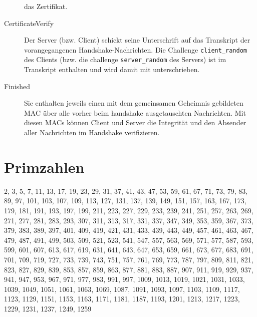 \documentclass[a4paper,landscape]{article}
\begin{document}
\begin{multicols*}{4}
\begin{description}
		      das Zertifikat.
		\item[CertificateVerify] Der Server (bzw. Client) schickt seine
		      Unterschrift auf das Transkript der vorangegangenen
		      Handshake-Nachrichten. Die Challenge \texttt{client\_random} des
		      Clients (bzw. die challenge \texttt{server\_random} des Servers)
		      ist im Transkript enthalten und wird damit mit unterschrieben.
		\item[Finished] Sie enthalten jeweils einen mit dem gemeinsamen
		      Geheimnis gebildeten MAC über alle vorher beim handshake ausgetauschten
		      Nachrichten. Mit diesen MACs können Client und Server die Integrität und
		      den Absender aller Nachrichten im Handshake verifizieren.
	\end{description}
	\section{Primzahlen}
	2, 3, 5, 7, 11, 13, 17, 19, 23, 29, 31, 37, 41, 43, 47, 53, 59, 61, 67, 71,
	73, 79, 83, 89, 97, 101, 103, 107, 109, 113, 127, 131, 137, 139, 149, 151,
	157, 163, 167, 173, 179, 181, 191, 193, 197, 199, 211, 223, 227, 229, 233,
	239, 241, 251, 257, 263, 269, 271, 277, 281, 283, 293, 307, 311, 313, 317,
	331, 337, 347, 349, 353, 359, 367, 373, 379, 383, 389, 397, 401, 409, 419,
	421, 431, 433, 439, 443, 449, 457, 461, 463, 467, 479, 487, 491, 499, 503,
	509, 521, 523, 541, 547, 557, 563, 569, 571, 577, 587, 593, 599, 601, 607,
	613, 617, 619, 631, 641, 643, 647, 653, 659, 661, 673, 677, 683, 691, 701,
	709, 719, 727, 733, 739, 743, 751, 757, 761, 769, 773, 787, 797, 809, 811,
	821, 823, 827, 829, 839, 853, 857, 859, 863, 877, 881, 883, 887, 907, 911,
	919, 929, 937, 941, 947, 953, 967, 971, 977, 983, 991, 997, 1009, 1013,
	1019, 1021, 1031, 1033, 1039, 1049, 1051, 1061, 1063, 1069, 1087, 1091,
	1093, 1097, 1103, 1109, 1117, 1123, 1129, 1151, 1153, 1163, 1171, 1181,
	1187, 1193, 1201, 1213, 1217, 1223, 1229, 1231, 1237, 1249, 1259
\end{multicols*}
\end{document}
